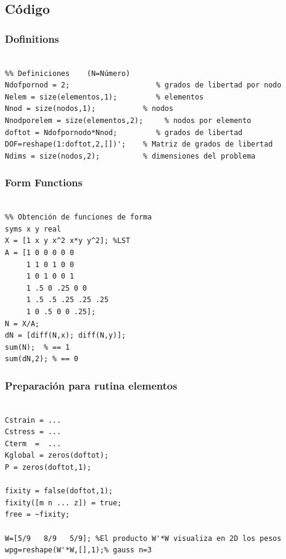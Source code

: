    \subsection*{Código \Matlab{}}
    \subsubsection*{Dofinitions}
    \begin{code}
    \begin{verbatim}

%% Definiciones    (N=Número)
Ndofpornod = 2;                    % grados de libertad por nodo
Nelem = size(elementos,1);         % elementos
Nnod = size(nodos,1);           % nodos
Nnodporelem = size(elementos,2);     % nodos por elemento
doftot = Ndofpornodo*Nnod;         % grados de libertad
DOF=reshape(1:doftot,2,[])';    % Matriz de grados de libertad
Ndims = size(nodos,2);          % dimensiones del problema
\end{verbatim}
\end{code}
\subsubsection*{Form Functions}
\begin{code}
\begin{verbatim}

%% Obtención de funciones de forma
syms x y real 
X = [1 x y x^2 x*y y^2]; %LST
A = [1 0 0 0 0 0
     1 1 0 1 0 0
     1 0 1 0 0 1
     1 .5 0 .25 0 0
     1 .5 .5 .25 .25 .25
     1 0 .5 0 0 .25]; 
N = X/A;
dN = [diff(N,x); diff(N,y)];
sum(N);  % == 1
sum(dN,2); % == 0        
\end{verbatim}
\end{code}

\subsubsection*{Preparación para rutina elementos}
\begin{code}
\begin{verbatim}
    
Cstrain = ...
Cstress = ...
Cterm  =  ...
Kglobal = zeros(doftot);
P = zeros(doftot,1); 

fixity = false(doftot,1);
fixity([m n ... z]) = true;
free = ~fixity;

W=[5/9   8/9   5/9]; %El producto W'*W visualiza en 2D los pesos
wpg=reshape(W'*W,[],1);% gauss n=3
\end{verbatim}
\end{code}


